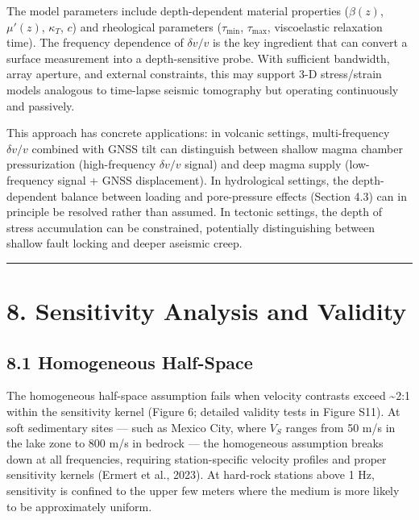 \documentclass[draft]{agujournal2019}
\begin{document}
The model parameters include depth-dependent material properties
(\(\beta(z)\), \(\mu'(z)\), \(\kappa_T\), \(c\)) and rheological
parameters (\(\tau_{\min}\), \(\tau_{\max}\), viscoelastic relaxation
time). The frequency dependence of \(\delta v/v\) is the key ingredient
that can convert a surface measurement into a depth-sensitive probe.
With sufficient bandwidth, array aperture, and external constraints,
this may support 3-D stress/strain models analogous to time-lapse
seismic tomography but operating continuously and passively.

This approach has concrete applications: in volcanic settings,
multi-frequency \(\delta v/v\) combined with GNSS tilt can distinguish
between shallow magma chamber pressurization (high-frequency
\(\delta v/v\) signal) and deep magma supply (low-frequency signal +
GNSS displacement). In hydrological settings, the depth-dependent
balance between loading and pore-pressure effects (Section 4.3) can in
principle be resolved rather than assumed. In tectonic settings, the
depth of stress accumulation can be constrained, potentially
distinguishing between shallow fault locking and deeper aseismic creep.

\begin{center}\rule{0.5\linewidth}{0.5pt}\end{center}

\section{8. Sensitivity Analysis and
Validity}\label{sensitivity-analysis-and-validity}

\subsection{8.1 Homogeneous Half-Space}\label{homogeneous-half-space}

The homogeneous half-space assumption fails when velocity contrasts
exceed \textasciitilde{}2:1 within the sensitivity kernel (Figure 6;
detailed validity tests in Figure S11). At soft sedimentary sites ---
such as Mexico City, where \(V_S\) ranges from 50 m/s in the lake zone
to 800 m/s in bedrock --- the homogeneous assumption breaks down at all
frequencies, requiring station-specific velocity profiles and proper
sensitivity kernels (Ermert et al., 2023). At hard-rock stations above 1
Hz, sensitivity is confined to the upper few meters where the medium is
more likely to be approximately uniform.
\end{document}
